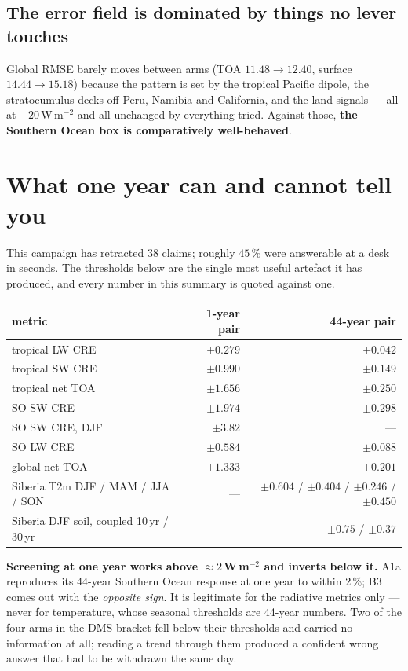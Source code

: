 \documentclass[10pt]{article}
\begin{document}
\subsection{The error field is dominated by things no lever touches}
Global RMSE barely moves between arms (TOA $11.48\to12.40$, surface $14.44\to15.18$)
because the pattern is set by the tropical Pacific dipole, the stratocumulus decks off
Peru, Namibia and California, and the land signals --- all at $\pm20$\,W\,m$^{-2}$ and all
unchanged by everything tried. Against those, \textbf{the Southern Ocean box is
comparatively well-behaved}.

\section{What one year can and cannot tell you}\label{sec:method}

This campaign has retracted 38 claims; roughly $45\,\%$ were answerable at a desk in
seconds. The thresholds below are the single most useful artefact it has produced, and
every number in this summary is quoted against one.

\begin{center}\footnotesize
\begin{tabular}{l r r}
\toprule
metric & 1-year pair & 44-year pair \\
\midrule
tropical LW CRE & $\pm0.279$ & $\pm0.042$ \\
tropical SW CRE & $\pm0.990$ & $\pm0.149$ \\
tropical net TOA & $\pm1.656$ & $\pm0.250$ \\
SO SW CRE & $\pm1.974$ & $\pm0.298$ \\
SO SW CRE, DJF & $\pm3.82$ & --- \\
SO LW CRE & $\pm0.584$ & $\pm0.088$ \\
global net TOA & $\pm1.333$ & $\pm0.201$ \\
Siberia T2m DJF / MAM / JJA / SON & --- & $\pm0.604$ / $\pm0.404$ / $\pm0.246$ / $\pm0.450$ \\
Siberia DJF soil, coupled 10\,yr / 30\,yr & \multicolumn{2}{r}{$\pm0.75$ / $\pm0.37$} \\
\bottomrule
\end{tabular}
\end{center}

\textbf{Screening at one year works above ${\approx}2$\,W\,m$^{-2}$ and inverts below it.}
A1a reproduces its 44-year Southern Ocean response at one year to within $2\,\%$; B3 comes
out with the \emph{opposite sign}. It is legitimate for the radiative metrics only --- never
for temperature, whose seasonal thresholds are 44-year numbers. Two of the four arms in the
DMS bracket fell below their thresholds and carried no information at all; reading a trend
through them produced a confident wrong answer that had to be withdrawn the same day.
\end{document}
